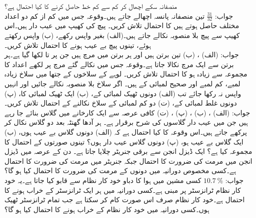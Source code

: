 \quad
{} منصفانہ سکے اچھال کر کم سے کم  خط حاصل کرنے کا کیا احتمال ہے؟\\
جواب:\quad
$\tfrac{31}{32}$
\quad
تین منصفانہ پانسہ اچھالے جاتے ہیں۔وقوعہ  جس میں کم از کم دو اعداد مختلف حاصل ہوتے ہیں کا احتمال تلاش کریں۔
\quad
{} پیچ کی کھیپ میں  عیب دار ہیں۔اس کھیپ سے  پیچ بلا منصوبہ نکالے جاتے ہیں۔(الف) بغیر واپس رکھے، (ب) واپس رکھتے ہوئے، تینوں پیچ بے عیب ہونے کا احتمال تلاش کریں۔\\
جواب:\quad
(الف) ، (ب) 
\quad
تین برتن ہیں اور ہر برتن میں  مرچ ہیں جن پر  تا  لکھا گیا ہے۔ہر برتن سے ایک مرچ نکالا جاتا ہے۔وقوعہ  جس میں نکالے گئے مرچ پر لکھے اعداد کا مجموعہ  سے زیادہ ہو کا احتمال تلاش کریں۔  
\quad
{} لوہے کے سلاخوں کے جتھا میں  سلاخ زیادہ لمبے،  کم لمبے اور  صحیح لمبائی کے ہیں۔ اگر  سلاخ بلا منصوبہ نکالے جائیں اور انہیں واپس نہ رکھا جائے تب (الف) دونوں ٹھیک لمبائی کے، (ب) ایک ٹھیک لمبائی کا، (پ) دونوں غلط لمبائی کے، (ت) دو کم لمبائی کے سلاخ  نکالنے  کے  احتمال تلاش کریں۔\\
جواب:\quad
(الف) ، (ب) ، (پ) ، (ت) 
\quad
کافی عرصہ سے ایک کارخانے میں گلاس بنائے جا رہے ہیں جن میں عیب دار گلاسوں کی شرح برقرار  ہے۔ ہر آدھا گھنٹہ بعد دو گلاس نکال کر پرکھے جاتے ہیں۔اس وقوعہ کا کیا احتمال ہے کہ  (الف) دونوں گلاس بے عیب ہوں، (ب) ایک گلاس بے عیب ہو، (پ) دونوں گلاس عیب دار ہوں؟ تینوں صورتوں کے احتمال کا مجموعہ کیا ہے؟ 
\quad
ایک ڈیزل انجن سے برقی جنریٹر  چلایا جاتا ہے۔ دن کے عرصہ میں ڈیزل انجن میں مرمت کی ضرورت کا احتمال  جبکہ جنریٹر میں مرمت کی ضرورت کا احتمال  ہے۔کسی مخصوص دورانیہ میں دونوں کے مرمت کی ضرورت کا احتمال کیا ہو گا؟\\
 جواب:\quad
$\SI{10.7}{\percent}$
\quad
کسی مشین میں ہوا کا دباو خود کار نظام سے قابو کیا جاتا ہے۔یہ خود کار نظام  ٹرانزسٹر پر مبنی ہے۔کسی دورانیہ میں ہر ایک ٹرانزسٹر کے خراب ہونے کا احتمال  ہے۔خود کار نظام صرف اس صورت کام کر سکتا ہے جب تمام ٹرانزسٹر ٹھیک ہوں۔کسی دورانیہ میں خود کار نظام کے خراب ہونے کا احتمال کیا ہو گا؟  
